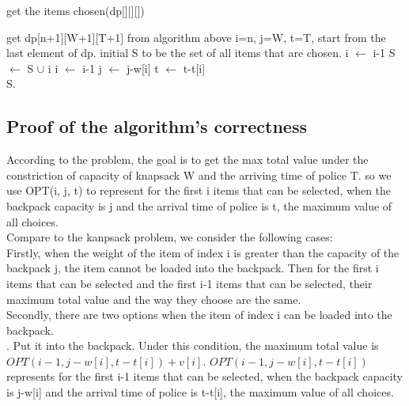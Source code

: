 \documentclass[]{article}
\begin{document}
	\begin{algorithm}[H]
		\caption{get the items chosen(dp[][][])}  
		\begin{algorithmic} 
			\Require 
			\State get dp[n+1][W+1][T+1] from algorithm above
			\Ensure
			\State i=n, j=W, t=T, start from the last element of dp.
			\State initial S to be the set of all items that are chosen.
					\State i $\leftarrow$ i-1
					\State S $\leftarrow$ S $\cup$ i
					\State i $\leftarrow$ i-1
					\State j $\leftarrow$ j-w[i]
					\State t $\leftarrow$ t-t[i]
				\EndIf
			\EndWhile   \\
			\Return S.
		\end{algorithmic}  
	\end{algorithm} 
	
	\subsection{Proof of the algorithm's correctness}
	
	According to the problem, the goal is to get the max total value under the constriction of capacity of knapsack W and the arriving time of police T. so we use OPT(i, j, t) to represent for the first i items that can be selected, when the backpack capacity is j and the arrival time of police is t, the maximum value of all choices.  \\ 
	
	\noindent Compare to the kanpsack problem, we consider the following cases:\\       
	
	\noindent Firstly, when the weight of the item of index i is greater than the capacity of the backpack j, the item cannot be loaded into the backpack. Then for the first i items that can be selected and the first i-1 items that can be selected, their maximum total value and the way they choose are the same.   \\
	
	\noindent Secondly, there are two options when the item of index i can be loaded into the backpack.   \\
	
  	. Put it into the backpack. Under this condition, the maximum total value is $OPT(i-1, j-w[i], t-t[i]) + v[i]$. $OPT(i-1, j-w[i], t-t[i])$ represents for the first i-1 items that can be selected, when the backpack capacity is j-w[i] and the arrival time of police is t-t[i], the maximum value of all choices.  \\
  
\end{document}
